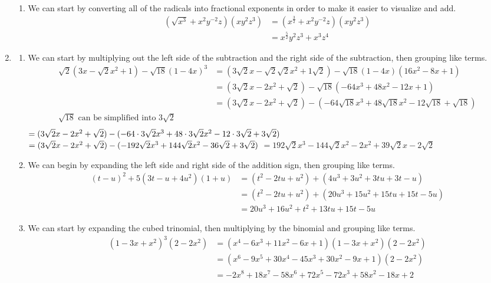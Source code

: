 \documentclass[11pt, letterpaper, twoside, tikz]{article}
\begin{document}
\begin{enumerate}
\begin{enumerate}[label=(\alph*)]
\item We can start by converting all of the radicals into fractional exponents in order to make it easier to visualize and add.
\begin{align*}
(\sqrt{x^3}+x^2y^{-2}z)(xy^2z^3)&= (x^{\frac{3}{2}}+x^2y^{-2}z)(xy^2z^3)\\
&= x^{\frac{5}{2}}y^2z^3+x^3z^4
\end{align*}

\end{enumerate}
\item \begin{enumerate}[label=(\alph*)] %
\item We can start by multiplying out the left side of the subtraction and the right side of the subtraction, then grouping like terms.
\begin{align*}
\sqrt{2}(3x-\sqrt2x^2+1)-\sqrt{18}(1-4x)^3&=(3\sqrt2x-\sqrt2\sqrt2x^2+1\sqrt2)-\sqrt{18}(1-4x)(16x^2-8x+1)\\
&=(3\sqrt2x-2x^2+\sqrt2)-\sqrt{18}(-64x^3+48x^2-12x+1)\\
&=(3\sqrt2x-2x^2+\sqrt2)-(-64\sqrt{18}x^3+48\sqrt{18}x^2-12\sqrt{18}+\sqrt{18})\\
\sqrt{18} \text { can be simplified into } 3\sqrt{2}\\
\end{align*}
$=(3\sqrt2x-2x^2+\sqrt2)-(-64\cdot 3\sqrt2x^3+48\cdot3\sqrt{2}x^2-12\cdot3\sqrt{2}+3\sqrt2)\\$
$=(3\sqrt2x-2x^2+\sqrt2)-(-192\sqrt{2}x^3+144\sqrt{2}x^2-36\sqrt{2}+3\sqrt{2})\\$
$=192\sqrt2x^3-144\sqrt2x^2-2x^2+39\sqrt2x-2\sqrt2$

\item We can begin by expanding the left side and right side of the addition sign, then grouping like terms.
\begin{align*}
(t-u)^2+5(3t-u+4u^2)(1+u)&=(t^2-2tu+u^2)+(4u^3+3u^2+3tu+3t-u)\\
&=(t^2-2tu+u^2)+(20u^3+15u^2+15tu+15t-5u)\\
&=20u^3+16u^2+t^2+13tu+15t-5u
\end{align*}

\item We can start by expanding the cubed trinomial, then multiplying by the binomial and grouping like terms.
\begin{align*}
(1-3x+x^2)^3(2-2x^2)&= (x^4-6x^3+11x^2-6x+1)(1-3x+x^2)(2-2x^2)\\
&= (x^6-9x^5+30x^4-45x^3+30x^2-9x+1)(2-2x^2)\\
&= -2x^8+18x^7-58x^6+72x^5-72x^3+58x^2-18x+2
\end{align*}


\end{enumerate}
\end{enumerate}
\end{document}
